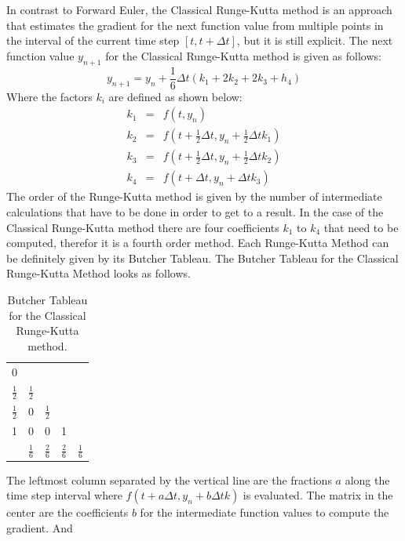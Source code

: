 \documentclass{aa}
\begin{document}
In contrast to Forward Euler, the Classical Runge-Kutta method is an approach that estimates
the gradient for the next function value from multiple points in the interval of the current
time step \([t, t + \Delta t]\), but it is still explicit. The next function value \(y_{n+1}\) for the Classical
Runge-Kutta method is given as follows:
\begin{equation}
    \label{eqn:crk_method}
    y_{n+1} = y_n + \frac{1}{6} \Delta t (k_1 + 2 k_2 + 2 k_3 + h_4)
\end{equation}
Where the factors \(k_i\) are defined as shown below:
\begin{eqnarray}
    \label{equ:k_1}
    k_1 & = & f(t, y_n) \\
    k_2 & = & f(t + \frac{1}{2}\Delta t, y_n + \frac{1}{2}\Delta t k_1)\\
    k_3 & = & f(t + \frac{1}{2}\Delta t, y_n + \frac{1}{2}\Delta t k_2)\\ \label{equ:k_4}
    k_4 & = & f(t + \Delta t, y_n + \Delta t k_3)
\end{eqnarray}
The order of the Runge-Kutta method is given by the number of intermediate calculations that
have to be done in order to get to a result. In the case of the Classical Runge-Kutta method
there are four coefficients \(k_1\) to \(k_4\) that need to be computed, therefor it is a
fourth order method. Each Runge-Kutta Method can be definitely given by its Butcher Tableau.
The Butcher Tableau for the Classical Runge-Kutta Method looks as follows.
\begin{table}[htpb]
    \centering
    \captionsetup{width = 0.9 \linewidth}
    \caption{Butcher Tableau for the Classical Runge-Kutta method.}
    \label{tab:crk_butcher_tableau}
    \begin{tabular}{c|cccc}
        0 &  &  &  & \\
        \(\frac{1}{2}\) & \(\frac{1}{2}\) &  &  & \\
        \(\frac{1}{2}\) & 0 & \(\frac{1}{2}\) & & \\
        1 & 0 & 0 & 1 & \\\hline
          & \(\frac{1}{6}\) & \(\frac{2}{6}\) & \(\frac{2}{6}\) & \(\frac{1}{6}\)    
    \end{tabular}
\end{table}
The leftmost column separated by the vertical line are the fractions \(a\) along the time step
interval where \(f(t + a\Delta t, y_n + b\Delta t k)\) is evaluated. The matrix in the center
are the coefficients \(b\) for the intermediate function values to compute the gradient. And
\end{document}
